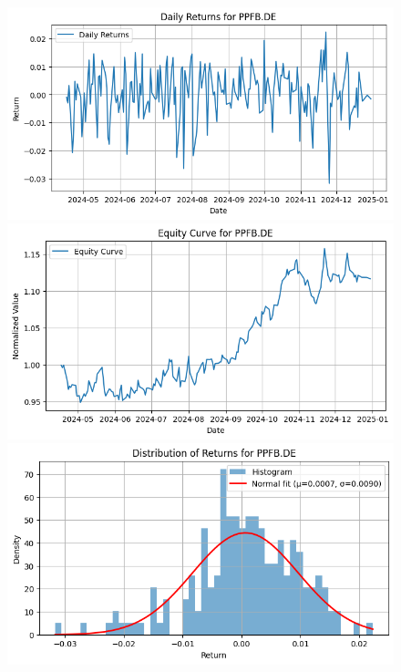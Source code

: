 \documentclass{article}%
\begin{document}
\begin{figure}[htbp]%
\begin{minipage}{0.31\textwidth}%
\includegraphics[width=\linewidth]{ticker_images/PPFB.DE_daily_returns.png}%
\end{minipage}%
\begin{minipage}{0.31\textwidth}%
\includegraphics[width=\linewidth]{ticker_images/PPFB.DE_equity_curve.png}%
\end{minipage}%
\begin{minipage}{0.31\textwidth}%
\includegraphics[width=\linewidth]{ticker_images/PPFB.DE_return_distribution.png}%
\end{minipage}%
\end{figure}
\end{document}
